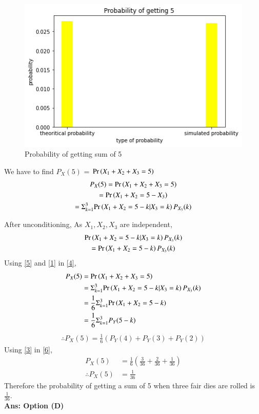 \documentclass[journal,12pt,twocolumn]{IEEEtran}
\begin{document}
\begin{figure}[htp]
    \centering
    \includegraphics[width=\columnwidth]{assign3.png}
    \caption{Probability of getting sum of 5}
\end{figure}
We have to find $P_X(5)$ = $\Pr\left(X_1+X_2+X_3=5\right)$
\begin{multline}
    P_X(5)=\Pr\left(X_1+X_2+X_3=5\right)\\
   =\Pr\left(X_1+X_2=5-X_3\right)\\
    =\Sigma_{k=1}^{3}{\Pr\left(X_1+X_2=5-k|X_3=k\right)P_{X_3}(k)}\label{4}
\end{multline}

After unconditioning, As $X_1,X_2,X_3$ are independent,
\begin{multline}
    {\ensuremath{\Pr\left(X_1+X_2=5-k|X_3=k\right)}P_{X_3}(k)}\\={\Pr\left(X_1+X_2=5-k\right)P_{X_3}(k)}\label{5}
\end{multline}
Using \eqref{5} and \eqref{1} in \eqref{4},
\begin{align*}
    P_X(5)&=\Pr\left(X_1+X_2+X_3=5\right)\\
    &=\Sigma_{k=1}^{3}{\Pr\left(X_1+X_2=5-k|X_3=k\right)P_{X_3}(k)}\\
     &=\frac{1}{6}\Sigma_{k=1}^{3}{\Pr\left(X_1+X_2=5-k\right)}\\
     &=\frac{1}{6}\Sigma_{k=1}^{3}{P_Y{(5-k)}}
\end{align*}
\begin{align}
   \therefore P_X(5) =\frac{1}{6}(P_Y(4)+P_Y(3)+P_Y(2))\label{6}
\end{align}
Using \eqref{3} in \eqref{6},
\begin{align}
    P_X(5)&=\frac{1}{6}(\frac{3}{36}+\frac{2}{36}+\frac{1}{36})\\
    \therefore P_X(5)&=\frac{1}{36}
\end{align}
Therefore the probability of getting a sum of 5 when three fair dies are rolled is $\frac{1}{36}$.\\
\textbf{Ans: Option (D)}
\end{document}
